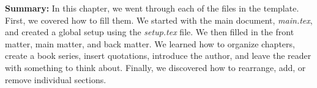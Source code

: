 \textbf{Summary:} In this chapter, we went through each of the files in the template. First, we covered how to fill them. We started with the main document, \textit{main.tex}, and created a global setup using the \textit{setup.tex} file. We then filled in the front matter, main matter, and back matter. We learned how to organize chapters, create a book series, insert quotations, introduce the author, and leave the reader with something to think about. Finally, we discovered how to rearrange, add, or remove individual sections.
